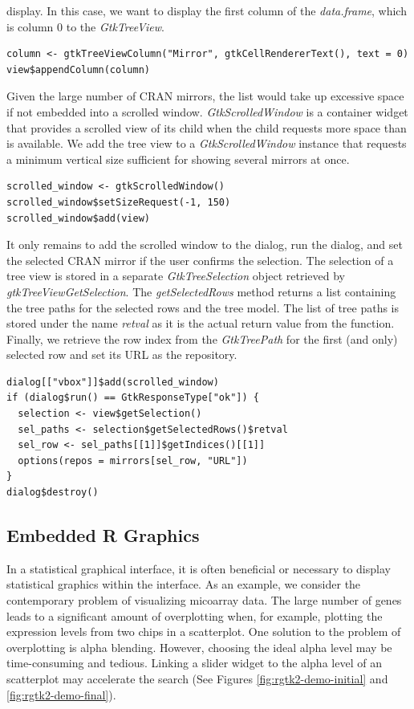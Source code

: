 \documentclass[article]{jss}
\begin{document}
display.
In this case, we want to display the first column of the
\emph{data.frame},
which is column $0$ to the \emph{GtkTreeView}.
\begin{verbatim}
column <- gtkTreeViewColumn("Mirror", gtkCellRendererText(), text = 0)
view$appendColumn(column)
\end{verbatim}
Given the large number of CRAN mirrors, the list would take up
excessive space
if not embedded into a scrolled window. \emph{GtkScrolledWindow} is a
container 
widget that provides a scrolled view of its child when the child
requests more
space than is available. We add the tree view to a
\emph{GtkScrolledWindow} 
instance that requests a minimum vertical size sufficient for showing
several 
mirrors at once.
\begin{verbatim}
scrolled_window <- gtkScrolledWindow()
scrolled_window$setSizeRequest(-1, 150)
scrolled_window$add(view)
\end{verbatim}
It only remains to add the scrolled window to the dialog, run the
dialog, and
set the selected CRAN mirror if the user confirms the selection. The
selection
of a tree view is stored in a separate \emph{GtkTreeSelection} object
retrieved
by \emph{gtkTreeViewGetSelection}. The \emph{getSelectedRows} method
returns a 
list containing the tree paths for the selected rows and the tree
model. The 
list of tree paths is stored under the name \emph{retval} as it is the
actual
return value from the  function. Finally, we retrieve the
row index
from the \emph{GtkTreePath} for the first (and only) selected row and
set its 
URL as the repository.
\begin{verbatim}
dialog[["vbox"]]$add(scrolled_window)
if (dialog$run() == GtkResponseType["ok"]) {
  selection <- view$getSelection()
  sel_paths <- selection$getSelectedRows()$retval
  sel_row <- sel_paths[[1]]$getIndices()[[1]]
  options(repos = mirrors[sel_row, "URL"])
}
dialog$destroy()
\end{verbatim}

\subsection{Embedded R Graphics}\label{sec:embedded-graphics}

In a statistical graphical interface, it is often beneficial or
necessary to display statistical graphics within the interface. As
an example, we consider the contemporary problem of visualizing
micoarray data. The large number of genes leads to a significant
amount of overplotting when, for example, plotting the expression
levels from two chips in a scatterplot. One solution to the problem of
overplotting is alpha blending. However, choosing the ideal alpha
level may be time-consuming and tedious. Linking a slider widget to
the alpha level of an  scatterplot may accelerate the
search (See Figures \ref{fig:rgtk2-demo-initial} and
\ref{fig:rgtk2-demo-final}).
\end{document}
